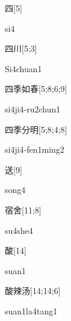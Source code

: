 \begin{verbete}[si4]{四}[5]
\begin{pronuncia}{si4}
\end{pronuncia}
\end{verbete}

\begin{verbete}[Si4chuan1]{四川}[5;3]
\begin{pronuncia}{Si4chuan1}
\end{pronuncia}
\end{verbete}

\begin{verbete}[si4ji4-ru2chun1]{四季如春}[5;8;6;9]
\begin{pronuncia}[\\]{si4ji4-ru2chun1}
\end{pronuncia}
\end{verbete}

\begin{verbete}{四季分明}[5;8;4;8]
\begin{pronuncia}[\\]{si4ji4-fen1ming2}
\end{pronuncia}
\end{verbete}

\begin{verbete}[song4]{送}[9]
\begin{pronuncia}{song4}
\end{pronuncia}
\end{verbete}

\begin{verbete}[su4she4]{宿舍}[11;8]
\begin{pronuncia}{su4she4}
\end{pronuncia}
\end{verbete}

\begin{verbete}[suan1]{酸}[14]
\begin{pronuncia}{suan1}
\end{pronuncia}
\end{verbete}

\begin{verbete}{酸辣汤}[14;14;6]
\begin{pronuncia}{suan1la4tang1}
\end{pronuncia}
\end{verbete}

